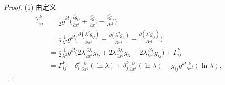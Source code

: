 \begin{proof}
  (1) 由定义
  \begin{align*}
    \tilde{\Gamma}_{ij}^k
    & = \frac{1}{2}\tilde{g}^{kl}\biggl(\frac{\partial\tilde{g}_{lj}}{\partial x^i}
      + \frac{\partial\tilde{g}_{li}}{\partial x^j}
      - \frac{\partial\tilde{g}_{ij}}{\partial x^l}\biggr) \\
    & = \frac{1}{2}\frac{1}{\lambda^2} g^{kl}
      \biggl(\frac{\partial (\lambda^2 g_{lj})}{\partial x^i}
      + \frac{\partial (\lambda^2 g_{li})}{\partial x^j}
      - \frac{\partial (\lambda^2 g_{ij})}{\partial x^l}\biggr) \\
    & = \frac{1}{2}\frac{1}{\lambda^2} g^{kl}
      \biggl(2\lambda\frac{\partial\lambda}{\partial x^i} g_{lj}
      + 2\lambda\frac{\partial\lambda}{\partial x^j} g_{li}
      - 2\lambda\frac{\partial\lambda}{\partial x^l} g_{ij}\biggr)
      + \Gamma_{ij}^k \\
    & = \Gamma_{ij}^k
      + \delta_i^k \frac{\partial}{\partial x^j}(\ln\lambda)
      + \delta_j^k \frac{\partial}{\partial x^i}(\ln\lambda)
      - g_{ij}g^{kl}\frac{\partial}{\partial x^l}(\ln\lambda).
  \end{align*}


\end{proof}

